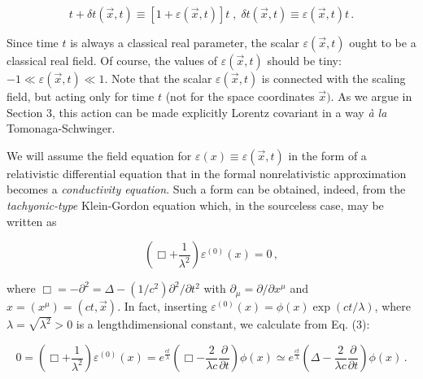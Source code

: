 \documentclass[a4paper,12pt]{article}
\begin{document}
\vspace{-0.2cm}
 
\begin{equation}
t + \delta t(\vec{x},t) \equiv [1 + \varepsilon (\vec{x},t)]t \;,\; \delta t(\vec{x},t) \equiv \varepsilon (\vec{x},t) t\,.
\end{equation}

\ni Since time $t$ is always a classical real parameter, the scalar $\varepsilon (\vec{x},t)$ ought to be a classical real field. Of course, the values of $\varepsilon(\vec{x},t)$ should be tiny: $ -1 \ll \varepsilon(\vec{x},t) \ll 1$. Note that the scalar $\varepsilon(\vec{x},t)$ is connected with the scaling field, but acting only for time $t$ (not for the space coordinates $\vec{x})$. As we argue in Section 3, this action can be made explicitly Lorentz covariant in a way {\it \`{a} la} Tomonaga-Schwinger.

\vspace{0.2cm}


\vspace{0.2cm}

We will assume the field equation for $\varepsilon(x) \equiv \varepsilon(\vec{x},t)$ in the form of a relativistic differential equation that in the formal nonrelativistic approximation becomes a {\it conductivity equation}. Such a form can be obtained, indeed, from the {\it tachyonic-type} Klein-Gordon equation which, in the sourceless case, may be written as

\begin{equation}
\left( \Box + \frac{1}{\lambda^2}\right) \varepsilon^{(0)} (x) = 0 \,,
\end{equation}

\ni where $\Box = -\partial^2 = \Delta - (1/c^2) \partial^2/\partial t^2$ with $\partial_\mu = \partial/\partial x^\mu$ and $x = (x^\mu) = (ct, \vec{x})$. In fact, inserting $\varepsilon^{(0)}(x) = \phi(x) \exp(ct/\lambda)$, where $\lambda = \sqrt{\lambda^2} >0$ is a lengthdimensional constant, we calculate from Eq. (3):

\begin{equation}
0 = \left( \Box + \frac{1}{\lambda^2}\right) \varepsilon^{(0)}(x) = e^{\frac{ct}{\lambda}}\left( \Box -  \frac{2}{\lambda c}\frac{\partial}{\partial t}\right) \phi(x) \simeq e^{\frac{ct}{\lambda}}\left( \Delta -  \frac{2}{\lambda c}\frac{\partial}{\partial t}\right) \phi(x)  \,.
\end{equation}
\end{document}
